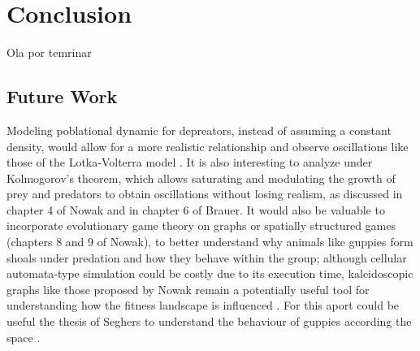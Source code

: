 \section{Conclusion}

Ola por temrinar


\subsection{Future Work}

Modeling poblational dynamic for depreators, instead of assuming a constant density, would allow for a more realistic relationship and observe oscillations like those of the Lotka-Volterra model . It is also interesting to analyze under Kolmogorov's theorem, which allows saturating and modulating the growth of prey and predators to obtain oscillations without losing realism, as discussed in chapter 4 of Nowak and in chapter 6 of Brauer\cite{nowakEvolutionaryDynamicsExploring2006, brauerMathematicalModelsPopulation2012}. It would also be valuable to incorporate evolutionary game theory on graphs or spatially structured games (chapters 8 and 9 of Nowak), to better understand why animals like guppies form shoals under predation and how they behave within the group; although cellular automata-type simulation could be costly due to its execution time, kaleidoscopic graphs like those proposed by Nowak remain a potentially useful tool for understanding how the fitness landscape is influenced \cite{nowakEvolutionaryDynamicsExploring2006}. For this aport could be useful the thesis of Seghers to understand the behaviour of guppies according the space \cite{hendrikANALYSISGEOGRAPHICVARIATION, reznickExperimentalStudiesEvolution2019}. \\